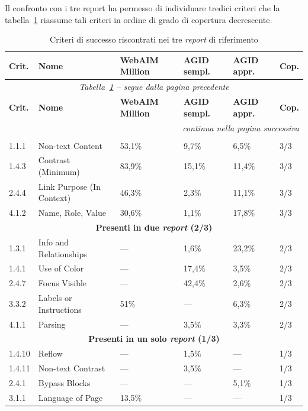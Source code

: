 Il confronto con i tre report ha permesso di individuare tredici criteri che la tabella~\ref{tab:frequenza-errori} riassume tali criteri in ordine di grado di copertura decrescente.

{\small
\begin{longtable}{|p{1.1cm}|p{3cm}|p{1.8cm}|p{1.8cm}|p{1.8cm}|p{0.8cm}|}
\caption{Criteri di successo riscontrati nei tre \emph{report} di riferimento}
\label{tab:frequenza-errori}\\
\hline
\textbf{Crit.} & \textbf{Nome} & \textbf{WebAIM Million} & \textbf{AGID sempl.} & \textbf{AGID appr.} & \textbf{Cop.} \\
\hline
\endfirsthead
\multicolumn{6}{c}{\textit{Tabella~\ref{tab:frequenza-errori} -- segue dalla pagina precedente}} \\
\hline
\textbf{Crit.} & \textbf{Nome} & \textbf{WebAIM Million} & \textbf{AGID sempl.} & \textbf{AGID appr.} & \textbf{Cop.} \\
\hline
\endhead
\hline
\multicolumn{6}{r}{\textit{continua nella pagina successiva}} \\
\endfoot
\hline
\endlastfoot
\multicolumn{6}{|c|}{\textbf{Presenti in tutti e tre i \emph{report} (3/3)}} \\
\hline
1.1.1 & Non-text Content & 53,1\% & 9,7\% & 6,5\% & 3/3 \\
\hline
1.4.3 & Contrast (Minimum) & 83,9\% & 15,1\% & 11,4\% & 3/3 \\
\hline
2.4.4 & Link Purpose (In Context) & 46,3\% & 2,3\% & 11,1\% & 3/3 \\
\hline
4.1.2 & Name, Role, Value & 30,6\% & 1,1\% & 17,8\% & 3/3 \\
\hline
\multicolumn{6}{|c|}{\textbf{Presenti in due \emph{report} (2/3)}} \\
\hline
1.3.1 & Info and Relationships & --- & 1,6\% & 23,2\% & 2/3 \\
\hline
1.4.1 & Use of Color & --- & 17,4\% & 3,5\% & 2/3 \\
\hline
2.4.7 & Focus Visible & --- & 42,4\% & 2,6\% & 2/3 \\
\hline
3.3.2 & Labels or Instructions & 51\% & --- & 6,3\% & 2/3 \\
\hline
4.1.1 & Parsing & --- & 3,5\% & 3,3\% & 2/3 \\
\hline
\multicolumn{6}{|c|}{\textbf{Presenti in un solo \emph{report} (1/3)}} \\
\hline
1.4.10 & Reflow & --- & 1,5\% & --- & 1/3 \\
\hline
1.4.11 & Non-text Contrast & --- & 3,5\% & --- & 1/3 \\
\hline
2.4.1 & Bypass Blocks & --- & --- & 5,1\% & 1/3 \\
\hline
3.1.1 & Language of Page & 13,5\% & --- & --- & 1/3 \\
\hline
\end{longtable}
}

